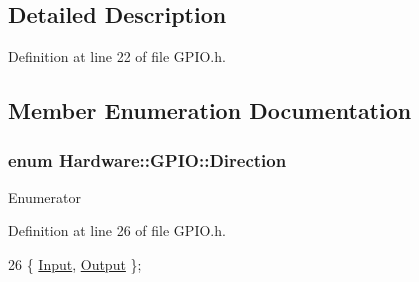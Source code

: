 \subsection{Detailed Description}


Definition at line 22 of file G\+P\+I\+O.\+h.



\subsection{Member Enumeration Documentation}
\hypertarget{class_hardware_1_1_g_p_i_o_a7507431d6341c146f22dcdb21b78ffd4}{}
\subsubsection[{Direction}]{\setlength{\rightskip}{0pt plus 5cm}enum {\bf Hardware\+::\+G\+P\+I\+O\+::\+Direction}}\label{class_hardware_1_1_g_p_i_o_a7507431d6341c146f22dcdb21b78ffd4}
\begin{Desc}
\item[Enumerator]\par
\begin{description}
\item[{\em 
\hypertarget{class_hardware_1_1_g_p_i_o_a7507431d6341c146f22dcdb21b78ffd4a5614339496b61db558bd9a26a327088e}{}Input\label{class_hardware_1_1_g_p_i_o_a7507431d6341c146f22dcdb21b78ffd4a5614339496b61db558bd9a26a327088e}
}]\item[{\em 
\hypertarget{class_hardware_1_1_g_p_i_o_a7507431d6341c146f22dcdb21b78ffd4a72432a9b39a6e45297b1158da8bb60eb}{}Output\label{class_hardware_1_1_g_p_i_o_a7507431d6341c146f22dcdb21b78ffd4a72432a9b39a6e45297b1158da8bb60eb}
}]\end{description}
\end{Desc}


Definition at line 26 of file G\+P\+I\+O.\+h.


\begin{DoxyCode}
26 \{ \hyperlink{class_hardware_1_1_g_p_i_o_a7507431d6341c146f22dcdb21b78ffd4a5614339496b61db558bd9a26a327088e}{Input}, \hyperlink{class_hardware_1_1_g_p_i_o_a7507431d6341c146f22dcdb21b78ffd4a72432a9b39a6e45297b1158da8bb60eb}{Output} \};
\end{DoxyCode}
\hypertarget{class_hardware_1_1_g_p_i_o_a9a7595aabdac9aec75f22e8b86342162}{}
